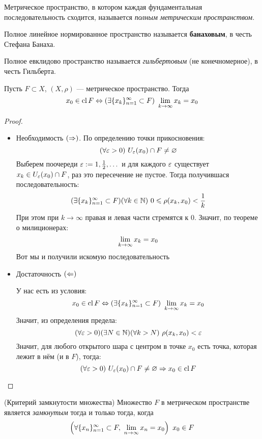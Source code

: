 \begin{definition}
	Метрическое пространство, в котором каждая
	фундаментальная последовательность сходится,
	называется \textit{полным метрическим пространством}.
	
	Полное линейное нормированное пространство
	называется \textbf{банаховым}, в честь Стефана Банаха.
	
	Полное евклидово пространство называется
	\textit{гильбертовым} (не конечномерное), в честь Гильберта.
\end{definition}

\begin{proposition} Пусть $F \subset X$, $(X, \rho)$ ---
	метрическое пространство. Тогда
	\[
		x_0 \in \operatorname{cl} F \Leftrightarrow (\exists \{x_k\}_{n = 1}^\infty \subset
		F)\ \lim\limits_{k \to \infty} x_k = x_0
	\]
\end{proposition}

\begin{proof}~
	\begin{itemize}
		\item Необходимость $(\Rightarrow)$.
			По определению точки прикосновения:
			\[
				(\forall \varepsilon > 0)\ U_\varepsilon(x_0) \cap F \neq \varnothing	
			\]
			Выберем поочереди $\varepsilon := 1, \frac{1}{2}, \dots$
			и для каждого $\varepsilon$ существует $x_k \in U_\varepsilon(x_0) \cap F$,
			раз это пересечение не пустое. Тогда
			получившася последовательность:
			\[
				(\exists \{x_k\}_{n = 1}^\infty \subset
				F)(\forall k \in \mathbb{N})\ 0 \leqslant \rho(x_k, x_0) < \frac{1}{k}
			\]
			При этом при $k \to \infty$ правая и левая части стремятся
			к 0. Значит, по теореме о милиционерах:
			\[
				\lim\limits_{k \to \infty} x_k = x_0
			\]
			Вот мы и получили искомую последовательность
		\item Достаточность $(\Leftarrow)$

			У нас есть из условия:
			\[
				x_0 \in \operatorname{cl} F \Leftrightarrow (\exists \{x_k\}_{n = 1}^\infty \subset
				F)\ \lim\limits_{k \to \infty} x_k = x_0
			\]
			Значит, из определения предела:
			\[
				(\forall \varepsilon > 0)(\exists N \in \mathbb{N})
				(\forall k > N)\ \rho(x_k, x_0) < \varepsilon
			\]
			Значит, для любого открытого шара с центром в точке
			$x_0$ есть точка, которая лежит в нём (и в $F$), тогда:
			\[
				(\forall \varepsilon > 0)\ U_\varepsilon(x_0) \cap F \neq
				\varnothing \Rightarrow x_0 \in \operatorname{cl} F	
			\]
	\end{itemize}
\end{proof}

\begin{theorem} (Критерий замкнутости множества)
	Множество $F$ в метрическом пространстве является
	\textit{замкнутым} тогда и только тогда, когда
	\[
		\left(\forall \{x_n\}_{n = 1}^\infty \subset F,
		\ \lim\limits_{n \to \infty} x_n = x_0\right)\ x_0 \in F
	\]
\end{theorem}

